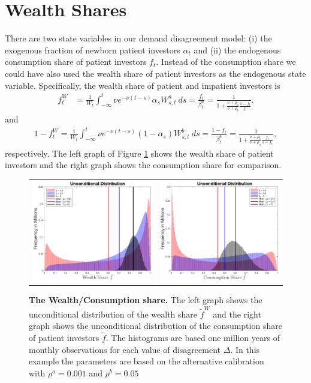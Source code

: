 \section{Wealth Shares}\label{secIA:WealthShares}

There are two state variables in our demand disagreement model: (i) the exogenous fraction of newborn patient investors $\alpha_t$ and (ii) the endogenous consumption share of patient investors $f_t$. Instead of the consumption share we could have also used the wealth share of patient investors as the endogenous state variable. Specifically, the wealth share of patient and impatient investors is
\begin{align*}
	f^W_t &= \frac{1}{W_t} \int_{-\infty}^t \nu  e^{-\nu(t-s)}    \alpha_s W_{s,t}^a \: ds =   \frac{f_t}{\beta^a_t} = \frac{1}{1 + \frac{\nu+\rho_a}{\nu+\rho_b} \frac{1-f_t}{f_t}}. 
\end{align*}
and
\begin{align*}
	1-f^W_t  = \frac{1}{W_t} \int_{-\infty}^t \nu  e^{-\nu(t-s)}   (1-\alpha_s) W_{s,t}^b \: ds   =  \frac{1-f_t}{\beta^b_t}
	= \frac{1}{1 + \frac{\nu+\rho_b}{\nu+\rho_a} \frac{f_t}{1-f_t}},
\end{align*}
respectively. The left graph of Figure \ref{fig:WealthShare} shows the wealth share of patient investors and the right graph shows the consumption share for comparison.  
\begin{figure}[htbp]
\centering
\vspace{0.1in}
\begin{tabular}{cc}
\includegraphics[width=.4\textwidth]{figures/ftWhist.eps} &
\includegraphics[width=.4\textwidth]{figures/ftHist.eps} \\
\end{tabular}
\caption{\textbf{The Wealth/Consumption share.} \footnotesize{The left graph shows the unconditional distribution of the wealth share $\tilde{f}^W$ and the right graph shows the unconditional distribution of the consumption share of patient investors $\tilde{f}$. The histograms are based one million years of monthly observations for each value of disagreement $\Delta$.  In this example the parameters are based on the alternative calibration with $\rho^a = 0.001$ and $\rho^b = 0.05$}} \label{fig:WealthShare} 
\end{figure}




